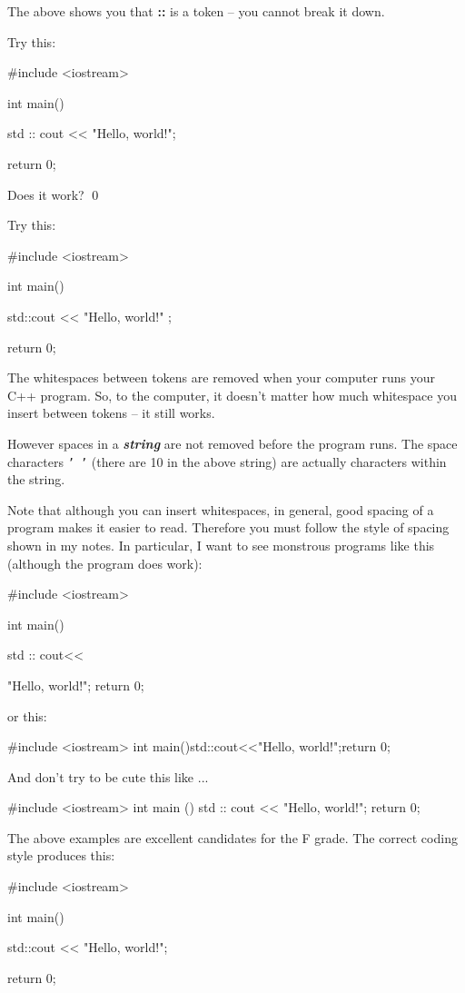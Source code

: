 The above 
shows you that \textbf{::} is a token – you cannot break it down.


\begin{ex}
Try this:
\begin{console}
#include <iostream>

int main()
{
    std    ::    cout << "Hello, world!\n";

    return 0;
}
\end{console}
Does it work?
\qed
\end{ex}


Try this:
\begin{console}
#include <iostream>

int main()
{
    std::cout << "Hello,          world!\n" ;

    return 0;
}
\end{console}


The whitespaces between tokens are removed when your computer runs your C++ program. So, to the computer, it doesn't matter how much whitespace you insert between tokens -- it still works.

However spaces in a \textit{\textbf{string}} 
are not removed before the program runs. 
The space characters \texttt{' '}
(there are 10 in the above string) are actually characters within the string.

Note that although you can insert whitespaces, 
in general, good spacing of a program makes it easier to read. 
Therefore you must follow the style of spacing shown in my notes. 
In particular, I 
 want to see monstrous programs like this 
(although the program does work):
\begin{console}
#include <iostream>

int                        main(){std
::
                    cout<<

"Hello, world!\n"; return 0; }
\end{console}
or this: 
\begin{console}
#include <iostream>
int main(){std::cout<<"Hello, world!\n";return 0;}
\end{console}
And don't try to be cute this like ...
\begin{console}
#include <iostream>
int
 main
  ()
   {
    std
     ::
      cout
       <<
        "Hello, world!\n"; 
         return 0; 
          }
\end{console}
The above examples are excellent candidates for the F grade. 
The correct coding style produces this:
\begin{console}
#include <iostream>

int main()
{
    std::cout << "Hello, world!\n";

    return 0;
}
\end{console}

